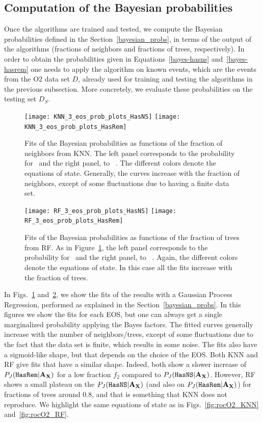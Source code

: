 \subsection{Computation of the Bayesian probabilities}

Once the algorithms are trained and tested, we compute the Bayesian
probabilities defined in the Section~\ref{bayesian_probs}, in terms of the 
output of the algorithms (fractions of neighbors and fractions of trees, 
respectively). In order to obtain the probabilities given in 
Equations~\ref{bayes-hasns} and~\ref{bayes-hasrem} one needs to apply
 the algorithm on known events, which are the events from the O2 data set $D$, already used for training and testing the algorithms in the previous subsection. More concretely, we evaluate these probabilities on the testing set $D_S$.

\begin{figure}%
\texttt{[image: KNN\_3\_eos\_prob\_plots\_HasNS]}
\texttt{[image: KNN\_3\_eos\_prob\_plots\_HasRem]}
\caption{Fits of the Bayesian probabilities as functions of the fraction of neighbors from \ac{KNN}. The left panel corresponds to the probability for \hasns\ and the right panel, to \hasrem\ . The different colors denote the equations of state. Generally, the curves increase with the fraction of neighbors, except of some fluctuations due to having a finite data set.}
\label{fig:bayesian_prob_fits_KNN}
\end{figure}

\begin{figure}%
\texttt{[image: RF\_3\_eos\_prob\_plots\_HasNS]}
\texttt{[image: RF\_3\_eos\_prob\_plots\_HasRem]}
\caption{Fits of the Bayesian probabilities as functions of the fraction of trees from \ac{RF}. As in Figure~\ref{fig:bayesian_prob_fits_KNN}, the left panel corresponds to the probability for \hasns\ and the right panel, to \hasrem\ . Again, the different colors denote the equations of state. In this case all the fits increase with the fraction of trees.}
\label{fig:bayesian_prob_fits_RF}
\end{figure}

In Figs.~\ref{fig:bayesian_prob_fits_KNN} and~\ref{fig:bayesian_prob_fits_RF}, 
we show the fits of  the results with a Gaussian Process Regression,
performed as explained in the Section~\ref{bayesian_probs}. In this figures we show
the fits for each EOS, but one can always get a single marginalized probability
applying the Bayes factors. The fitted curves generally increase with the number of neighbors/trees, except of some fluctuations due to the fact that the data set is finite, which results in some noise. The fits also have a
sigmoid-like shape, but that depends on the choice of the EOS. Both \ac{KNN}
and \ac{RF} give fits that have a similar shape. Indeed, both show a slower
increase of $P_J({{\tt HasRem}} |\bf{A_X})$ for a low fraction $f_2$ compared to $P_J({{\tt HasNS}} |\bf{A_X})$.
However, \ac{RF} shows a small plateau on the $P_J({{\tt HasNS}} |\bf{A_X})$ (and also on
$P_J({{\tt HasRem}} |\bf{A_X})$) for fractions of trees around $0.8$, and that is something that
\ac{KNN} does not reproduce. We highlight the same equations of state as in
Figs.~\ref{fig:rocO2_KNN} and~\ref{fig:rocO2_RF}.

